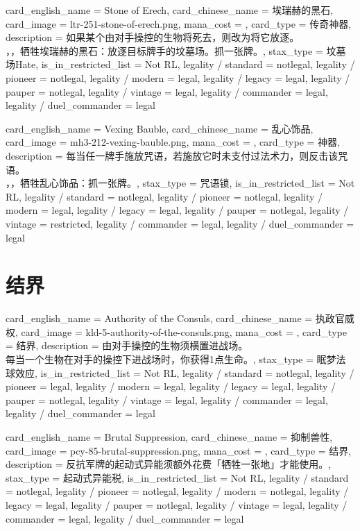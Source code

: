 \documentclass[lang = cn, color = black, 10pt]{AllThatStax}
\begin{document}
\card
{
	card_english_name = {Stone of Erech},
	card_chinese_name = {埃瑞赫的黑石},
	card_image = ltr-251-stone-of-erech.png,
	mana_cost = ,
	card_type = 传奇神器,
	description = {如果某个由对手操控的生物将死去，则改为将它放逐。\\
，，牺牲埃瑞赫的黑石：放逐目标牌手的坟墓场。抓一张牌。},
	stax_type = 坟墓场Hate,
	is_in_restricted_list = Not RL,
	legality / standard = notlegal,
	legality / pioneer = notlegal,
	legality / modern = legal,
	legality / legacy = legal,
	legality / pauper = notlegal,
	legality / vintage = legal,
	legality / commander = legal,
	legality / duel_commander = legal
}

\card
{
	card_english_name = {Vexing Bauble},
	card_chinese_name = {乱心饰品},
	card_image = mh3-212-vexing-bauble.png,
	mana_cost = ,
	card_type = 神器,
	description = {每当任一牌手施放咒语，若施放它时未支付过法术力，则反击该咒语。\\
，，牺牲乱心饰品：抓一张牌。},
	stax_type = 咒语锁,
	is_in_restricted_list = Not RL,
	legality / standard = notlegal,
	legality / pioneer = notlegal,
	legality / modern = legal,
	legality / legacy = legal,
	legality / pauper = notlegal,
	legality / vintage = restricted,
	legality / commander = legal,
	legality / duel_commander = legal
}

\section{结界}

\card
{
	card_english_name = {Authority of the Consuls},
	card_chinese_name = {执政官威权},
	card_image = kld-5-authority-of-the-consuls.png,
	mana_cost = ,
	card_type = 结界,
	description = {由对手操控的生物须横置进战场。\\
每当一个生物在对手的操控下进战场时，你获得1点生命。},
	stax_type = 眠梦法球效应,
	is_in_restricted_list = Not RL,
	legality / standard = notlegal,
	legality / pioneer = legal,
	legality / modern = legal,
	legality / legacy = legal,
	legality / pauper = notlegal,
	legality / vintage = legal,
	legality / commander = legal,
	legality / duel_commander = legal
}

\card
{
	card_english_name = {Brutal Suppression},
	card_chinese_name = {抑制兽性},
	card_image = pcy-85-brutal-suppression.png,
	mana_cost = ,
	card_type = 结界,
	description = {反抗军牌的起动式异能须额外花费「牺牲一张地」才能使用。},
	stax_type = 起动式异能税,
	is_in_restricted_list = Not RL,
	legality / standard = notlegal,
	legality / pioneer = notlegal,
	legality / modern = notlegal,
	legality / legacy = legal,
	legality / pauper = notlegal,
	legality / vintage = legal,
	legality / commander = legal,
	legality / duel_commander = legal
}
\end{document}
